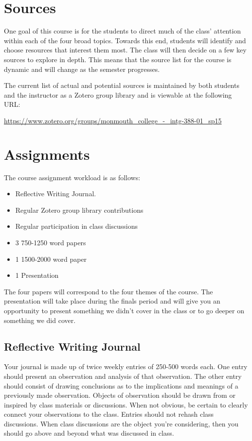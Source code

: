 \documentclass[]{tufte-handout}
\begin{document}
\section{Sources}

One goal of this course is for the students to direct much of the class' attention within each of the four broad topics. Towards this end, students will identify and choose resources that interest them most. The class will then decide on a few key sources to explore in depth. This means that the source list for the course is dynamic and will change as the semester progresses.

The current list of actual and potential sources is maintained by both students and the instructor as a Zotero group library and is viewable at the following URL:
\vspace{.2in}

\begin{footnotesize}
\url{https://www.zotero.org/groups/monmouth_college_-_intg-388-01_sp15}
\end{footnotesize}

 
\section{Assignments}

The course assignment workload is as follows:
\begin{itemize}
\item Reflective Writing Journal. 
\item Regular Zotero group library contributions
\item Regular participation in class discussions
\item 3 750-1250 word papers
\item 1 1500-2000 word paper
\item 1 Presentation 
\end{itemize}
The four papers will correspond to the four themes of the course. The presentation will take place during the finals period and will give you an opportunity to present something we didn't cover in the class or to go deeper on something we did cover.  

\subsection{Reflective Writing Journal}

Your journal is made up of twice weekly entries of 250-500 words each. One entry should present an observation and analysis of that observation. The other entry should consist of drawing conclusions as to the implications and meanings of a previously made observation.  Objects of observation should be drawn from or inspired by class materials or discussions.  When not obvious, be certain to clearly connect your observations to the class. Entries should not rehash class discussions. When class discussions are the object you're considering, then you should go above and beyond what was discussed in class. 
\end{document}

